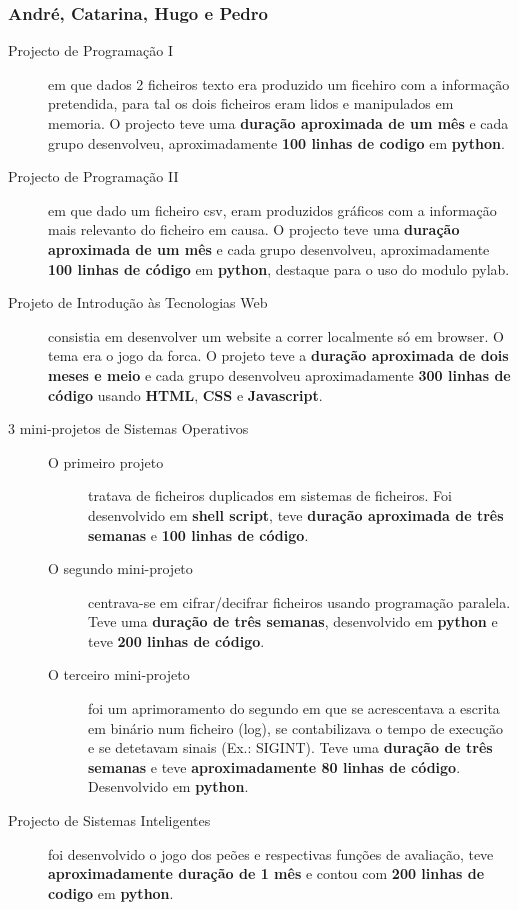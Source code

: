 \documentclass[a4paper]{report}
\begin{document}
\subsubsection*{André, Catarina, Hugo e Pedro} 
\begin{description}
\item[Projecto de Programação I] em que dados 2 ficheiros texto era produzido um ficehiro com a informação pretendida, para tal os dois ficheiros eram lidos e manipulados em memoria. O projecto teve uma \textbf{duração aproximada de um mês} e cada grupo desenvolveu, aproximadamente \textbf{100 linhas de codigo} em \textbf{python}.

\item[Projecto de Programação II] em que dado um ficheiro csv, eram produzidos gráficos com a informação mais relevanto do ficheiro em causa. O projecto teve uma \textbf{duração aproximada de um mês} e cada grupo desenvolveu, aproximadamente \textbf{100 linhas de código} em \textbf{python}, destaque para o uso do modulo pylab.

\item [Projeto de Introdução às Tecnologias Web] consistia em desenvolver um website a correr localmente só em browser. O tema era o jogo da forca. O projeto teve a \textbf{duração aproximada de dois meses e meio} e cada grupo desenvolveu aproximadamente \textbf{300 linhas de código} usando \textbf{HTML}, \textbf{CSS} e \textbf{Javascript}.

\item[3 mini-projetos de Sistemas Operativos]\mbox{}
	\begin{description}
		\item[O primeiro projeto] tratava de ficheiros duplicados em sistemas de ficheiros. Foi desenvolvido em \textbf{shell script}, teve \textbf{duração aproximada de três semanas} e \textbf{100 linhas de código}.
		
		\item [O segundo mini-projeto] centrava-se em cifrar/decifrar ficheiros usando programação paralela. Teve uma \textbf{duração de três semanas}, desenvolvido em \textbf{python} e teve \textbf{200 linhas de código}.
		
		\item[O terceiro mini-projeto] foi um aprimoramento do segundo em que se acrescentava a escrita em binário num ficheiro (log), se contabilizava o tempo de execução e se detetavam sinais (Ex.: SIGINT). Teve uma \textbf{duração de três semanas} e teve \textbf{aproximadamente 80 linhas de código}. Desenvolvido em \textbf{python}.
	\end{description}
	\item[Projecto de Sistemas Inteligentes] foi desenvolvido o jogo dos peões e respectivas funções de avaliação, teve \textbf{aproximadamente duração de 1 mês} e contou com \textbf{200 linhas de codigo} em \textbf{python}.
\end{description}
\end{document}
